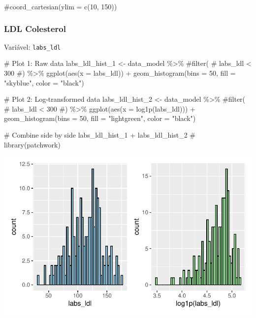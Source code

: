 \documentclass[
  12pt,
]{article}
\newenvironment{Shaded}{\begin{snugshade}}{\end{snugshade}}
\newcommand{\AttributeTok}[1]{\textcolor[rgb]{0.40,0.45,0.13}{#1}}
\newcommand{\CommentTok}[1]{\textcolor[rgb]{0.37,0.37,0.37}{#1}}
\newcommand{\DecValTok}[1]{\textcolor[rgb]{0.68,0.00,0.00}{#1}}
\newcommand{\FunctionTok}[1]{\textcolor[rgb]{0.28,0.35,0.67}{#1}}
\newcommand{\NormalTok}[1]{\textcolor[rgb]{0.00,0.23,0.31}{#1}}
\newcommand{\OtherTok}[1]{\textcolor[rgb]{0.00,0.23,0.31}{#1}}
\newcommand{\SpecialCharTok}[1]{\textcolor[rgb]{0.37,0.37,0.37}{#1}}
\newcommand{\StringTok}[1]{\textcolor[rgb]{0.13,0.47,0.30}{#1}}
\begin{document}
\begin{Shaded}
\begin{Highlighting}[]
    \CommentTok{\#coord\_cartesian(ylim = c(10, 150))}
\end{Highlighting}
\end{Shaded}

\subsubsection{LDL Colesterol}\label{ldl-colesterol}

Variável: \texttt{labs\_ldl}

\begin{Shaded}
\begin{Highlighting}[]
\CommentTok{\# Plot 1: Raw data}
\NormalTok{labs\_ldl\_hist\_1 }\OtherTok{\textless{}{-}}\NormalTok{ data\_model }\SpecialCharTok{\%\textgreater{}\%} 
    \CommentTok{\#filter(}
    \CommentTok{\#    labs\_ldl \textless{} 300}
    \CommentTok{\#) \%\textgreater{}\% }
    \FunctionTok{ggplot}\NormalTok{(}\FunctionTok{aes}\NormalTok{(}\AttributeTok{x =}\NormalTok{ labs\_ldl)) }\SpecialCharTok{+} 
    \FunctionTok{geom\_histogram}\NormalTok{(}\AttributeTok{bins =} \DecValTok{50}\NormalTok{, }\AttributeTok{fill =} \StringTok{"skyblue"}\NormalTok{, }\AttributeTok{color =} \StringTok{"black"}\NormalTok{)}

\CommentTok{\# Plot 2: Log{-}transformed data}
\NormalTok{labs\_ldl\_hist\_2 }\OtherTok{\textless{}{-}}\NormalTok{ data\_model }\SpecialCharTok{\%\textgreater{}\%} 
    \CommentTok{\#filter(}
    \CommentTok{\#    labs\_ldl \textless{} 300}
    \CommentTok{\#) \%\textgreater{}\%}
    \FunctionTok{ggplot}\NormalTok{(}\FunctionTok{aes}\NormalTok{(}\AttributeTok{x =} \FunctionTok{log1p}\NormalTok{(labs\_ldl))) }\SpecialCharTok{+} 
    \FunctionTok{geom\_histogram}\NormalTok{(}\AttributeTok{bins =} \DecValTok{50}\NormalTok{, }\AttributeTok{fill =} \StringTok{"lightgreen"}\NormalTok{, }\AttributeTok{color =} \StringTok{"black"}\NormalTok{)}

\CommentTok{\# Combine side by side}
\NormalTok{labs\_ldl\_hist\_1 }\SpecialCharTok{+}\NormalTok{ labs\_ldl\_hist\_2 }\CommentTok{\# library(patchwork)}
\end{Highlighting}
\end{Shaded}

\includegraphics{Outcomes_files/figure-pdf/labs_ldl_1-1.pdf}
\end{document}
